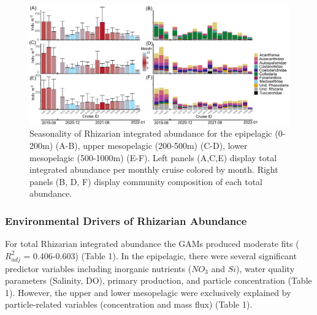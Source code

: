 \documentclass[
]{article}
\begin{document}
\begin{figure}

{\centering \includegraphics{images/05_seasonality.pdf}

}

\caption{Seasonality of Rhizarian integrated abundance for the
epipelagic (0-200m) (A-B), upper mesopelagic (200-500m) (C-D), lower
mesopelagic (500-1000m) (E-F). Left panels (A,C,E) display total
integrated abundance per monthly cruise colored by month. Right panels
(B, D, F) display community composition of each total abundance.}

\end{figure}

\hypertarget{environmental-drivers-of-rhizarian-abundance}{%
\subsubsection{Environmental Drivers of Rhizarian
Abundance}\label{environmental-drivers-of-rhizarian-abundance}}

For total Rhizarian integrated abundance the GAMs produced moderate fits
(\(R^2_{adj}\) = 0.406-0.603) (Table 1). In the epipelagic, there were
several significant predictor variables including inorganic nutrients
(\(NO_3\) and \(Si\)), water quality parameters (Salinity, DO), primary
production, and particle concentration (Table 1). However, the upper and
lower mesopelagic were exclusively explained by particle-related
variables (concentration and mass flux) (Table 1).
\end{document}

